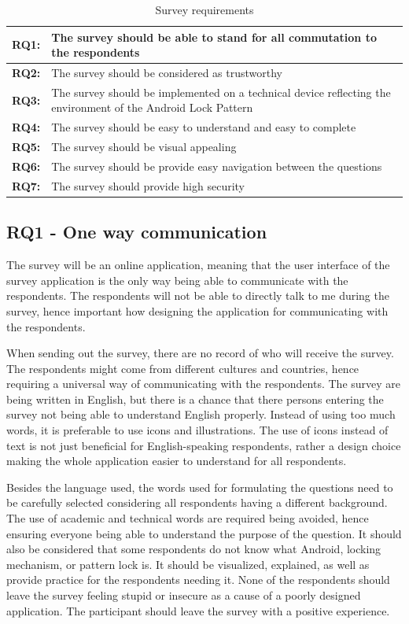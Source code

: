     \begin{table}[H]
      \centering
      \begin{tabular}{ p{1cm} | p{9cm} }
        \hline
        {\bf RQ1:} & The survey should be able to stand for all commutation to the respondents \\ \hline
        {\bf RQ2:} & The survey should be considered as trustworthy \\ \hline
        {\bf RQ3:} & The survey should be implemented on a technical device reflecting the environment of the Android Lock Pattern \\ \hline
        {\bf RQ4:} & The survey should be easy to understand and easy to complete \\ \hline
        {\bf RQ5:} & The survey should be visual appealing \\ \hline
        {\bf RQ6:} & The survey should be provide easy navigation between the questions \\ \hline
        {\bf RQ7:} & The survey should provide high security \\ \hline
      \end{tabular}
      \caption{Survey requirements}
      \label{tab:requirements}
    \end{table}

    \subsection*{RQ1 - One way communication}
    The survey will be an online application, meaning that the user interface of the survey application is the only way being able to communicate with the respondents. The respondents will not be able to directly talk to me during the survey, hence important how designing the application for communicating with the respondents.

    When sending out the survey, there are no record of who will receive the survey.  The respondents might come from different cultures and countries, hence requiring a universal way of communicating with the respondents. The survey are being written in English, but there is a chance that there persons entering the survey not being able to understand English properly. Instead of using too much words, it is preferable to use icons and illustrations. The use of icons instead of text is not just beneficial for English-speaking respondents, rather a design choice making the whole application easier to understand for all respondents.

    Besides the language used, the words used for formulating the questions need to be carefully selected considering all respondents having a different background. The use of academic and technical words are required being avoided, hence ensuring everyone being able to understand the purpose of the question. It should also be considered that some respondents do not know what Android, locking mechanism, or pattern lock is. It should be visualized, explained, as well as provide practice for the respondents needing it. None of the respondents should leave the survey feeling stupid or insecure as a cause of a poorly designed application. The participant should leave the survey with a positive experience. 

